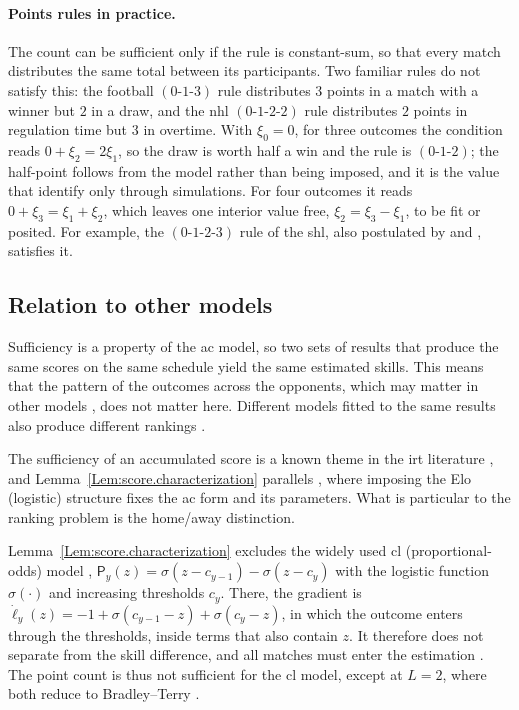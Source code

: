 \documentclass[letterpaper,12pt]{article}
\newcommand{\mf}[1]{\mathsf{#1}}
\newcommand{\cd}{\cdot}
\newcommand{\mfP}{\mf{P}}
\begin{document}
\paragraph{Points rules in practice.}
The count can be sufficient only if the rule is constant-sum, so that every match distributes the same total between its participants. Two familiar rules do not satisfy this: the football $(0\text{-}1\text{-}3)$ rule distributes $3$ points in a match with a winner but $2$ in a draw, and the \gls{nhl} $(0\text{-}1\text{-}2\text{-}2)$ rule distributes $2$ points in regulation time but $3$ in overtime. With $\xi_0=0$, for three outcomes the condition reads $0+\xi_2=2\xi_1$, so the draw is worth half a win and the rule is $(0\text{-}1\text{-}2)$; the half-point follows from the model rather than being imposed, and it is the value that \citet[Sec.~5.5]{Lasek18} identify only through simulations. For four outcomes it reads $0+\xi_3=\xi_1+\xi_2$, which leaves one interior value free, $\xi_2=\xi_3-\xi_1$, to be fit or posited. For example, the $(0\text{-}1\text{-}2\text{-}3)$ rule of the \gls{shl}, also postulated by \citet{LeBrun09} and \citet{Luszczyszyn17}, satisfies it.

\subsection{Relation to other models}\label{Sec:related.models}
Sufficiency is a property of the \gls{ac} model, so two sets of results that produce the same scores on the same schedule yield the same estimated skills. This means that the pattern of the outcomes across the opponents, which may matter in other models \citep{Remage66,deCani69,Tiwisina19}, does not matter here. Different models fitted to the same results also produce different rankings \citep{Ley19}.

The sufficiency of an accumulated score is a known theme in the \gls{irt} literature \citep{Andersen77,Masters82}, and Lemma~\ref{Lem:score.characterization} parallels \citet[Proposition 1]{Szczecinski26b}, where imposing the Elo (logistic) structure fixes the \gls{ac} form and its parameters. What is particular to the ranking problem is the home/away distinction.

Lemma~\ref{Lem:score.characterization} excludes the widely used \gls{cl} (proportional-odds) model \citep{Agresti92,Tutz20}, $\mfP_y(z)=\sigma(z-c_{y-1})-\sigma(z-c_y)$ with the logistic function $\sigma(\cd)$ and increasing thresholds $c_y$. There, the gradient is $\dot\ell_y(z)=-1+\sigma(c_{y-1}-z)+\sigma(c_y-z)$, in which the outcome enters through the thresholds, inside terms that also contain $z$. It therefore does not separate from the skill difference, and all matches must enter the estimation \citep[Sec.~8.2.2]{Agresti13_book}. The point count is thus not sufficient for the \gls{cl} model, except at $L=2$, where both reduce to Bradley--Terry \citep{Bradley52}.
\end{document}
